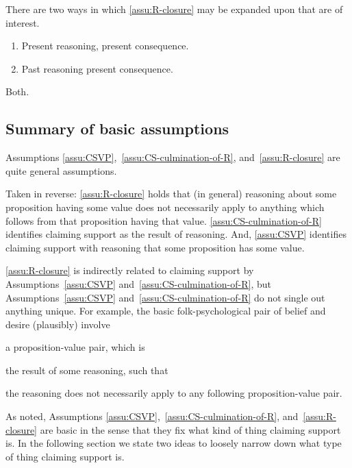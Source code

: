 \begin{note}
  There are two ways in which \autoref{assu:R-closure} may be expanded upon that are of interest.

  \begin{enumerate}
  \item Present reasoning, present consequence.
  \item Past reasoning present consequence.
  \end{enumerate}

  Both.
\end{note}

\subsection{Summary of basic assumptions}
\label{sec:summary}

\begin{note}
  Assumptions \ref{assu:CSVP},~\ref{assu:CS-culmination-of-R}, and~\ref{assu:R-closure} are quite general assumptions.

  Taken in reverse:
  \autoref{assu:R-closure} holds that (in general) reasoning about some proposition having some value does not necessarily apply to anything which follows from that proposition having that value.
  \autoref{assu:CS-culmination-of-R} identifies claiming support as the result of reasoning.
  And, \autoref{assu:CSVP} identifies claiming support with reasoning that some proposition has some value.

  \autoref{assu:R-closure} is indirectly related to claiming support by Assumptions~\ref{assu:CSVP} and~\ref{assu:CS-culmination-of-R}, but Assumptions~\ref{assu:CSVP} and~\ref{assu:CS-culmination-of-R} do not single out anything unique.
  For example, the basic folk-psychological pair of belief and desire (plausibly) involve
  \begin{enumerate*}
  \item a proposition-value pair, which is
  \item the result of some reasoning, such that
  \item the reasoning does not necessarily apply to any following proposition-value pair.
  \end{enumerate*}
  As noted, Assumptions \ref{assu:CSVP},~\ref{assu:CS-culmination-of-R}, and~\ref{assu:R-closure} are basic in the sense that they fix what kind of thing claiming support is.
  In the following section we state two ideas to loosely narrow down what type of thing claiming support is.
\end{note}

